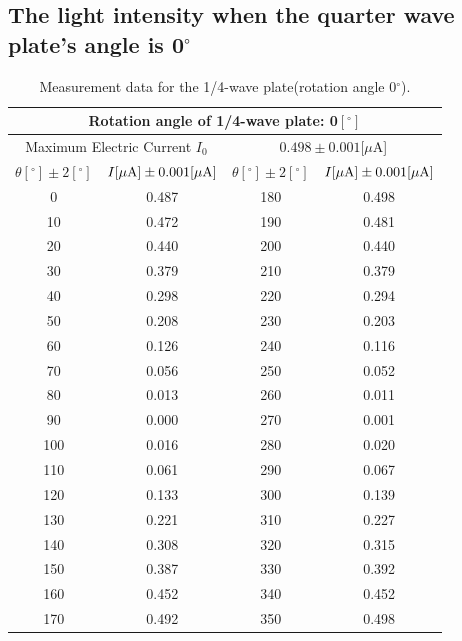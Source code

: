 \documentclass{my_template}
\begin{document}
    \subsection{The light intensity when the quarter wave plate's angle is 0$^\circ$}\label{sec:0}
    \begin{table}[!ht]
        \centering
        \begin{tabular}{|c|c||c|c|}
            \hline
            \multicolumn{4}{|c|}{Rotation angle of 1/4-wave plate: 0$[^\circ]$}\\\hline
            \multicolumn{2}{|c||}{Maximum Electric Current $I_0$}&\multicolumn{2}{c|}{$0.498\pm 0.001[\mu$A]}\\\hline
            $\theta[^\circ]\pm 2[^\circ]$&$I[\mu \rm A]\pm 0.001 [\mu A]$&$\theta[^\circ]\pm 2[^\circ]$&$I[\mu \rm A]\pm 0.001 [\mu A]$\\\hline
            0&0.487&180&0.498\\\hline
            10&0.472&190&0.481\\\hline
            20&0.440&200&0.440\\\hline
            30&0.379&210&0.379\\\hline
            40&0.298&220&0.294\\\hline
            50&0.208&230&0.203\\\hline
            60&0.126&240&0.116\\\hline
            70&0.056&250&0.052\\\hline
            80&0.013&260&0.011\\\hline
            90&0.000&270&0.001\\\hline
            100&0.016&280&0.020\\\hline
            110&0.061&290&0.067\\\hline
            120&0.133&300&0.139\\\hline
            130&0.221&310&0.227\\\hline
            140&0.308&320&0.315\\\hline
            150&0.387&330&0.392\\\hline
            160&0.452&340&0.452\\\hline
            170&0.492&350&0.498\\\hline
        \end{tabular}
        \caption{Measurement data for the 1/4-wave plate(rotation angle 0$^\circ$).}
        \label{tab:0 quarterplate}
    \end{table}
\end{document}
